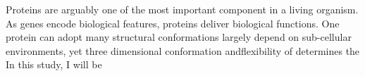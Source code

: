 Proteins are arguably one of the most important component in a living organism. As genes encode biological features, proteins deliver biological functions. One protein can adopt many structural conformations largely depend on sub-cellular environments, yet three dimensional conformation andflexibility of  determines the     In this study, I will be 
